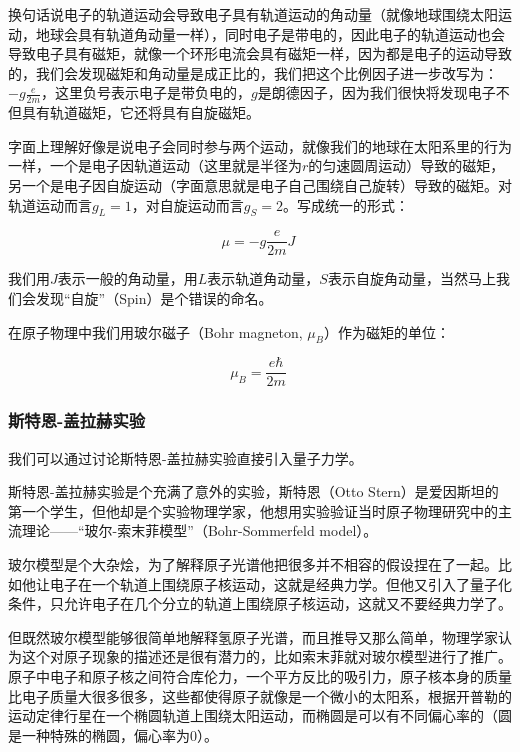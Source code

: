 换句话说电子的轨道运动会导致电子具有轨道运动的角动量（就像地球围绕太阳运动，地球会具有轨道角动量一样），同时电子是带电的，因此电子的轨道运动也会导致电子具有磁矩，就像一个环形电流会具有磁矩一样，因为都是电子的运动导致的，我们会发现磁矩和角动量是成正比的，我们把这个比例因子进一步改写为：$- g \frac{e}{2m}$，这里负号表示电子是带负电的，$g$是朗德因子，因为我们很快将发现电子不但具有轨道磁矩，它还将具有自旋磁矩。

字面上理解好像是说电子会同时参与两个运动，就像我们的地球在太阳系里的行为一样，一个是电子因轨道运动（这里就是半径为$r$的匀速圆周运动）导致的磁矩，另一个是电子因自旋运动（字面意思就是电子自己围绕自己旋转）导致的磁矩。对轨道运动而言$g_L = 1$，对自旋运动而言$g_S = 2$。写成统一的形式：

\begin{equation}
\mu = - g \frac{e}{2m} J~
\end{equation}

我们用$J$表示一般的角动量，用$L$表示轨道角动量，$S$表示自旋角动量，当然马上我们会发现“自旋”（Spin）是个错误的命名。

在原子物理中我们用玻尔磁子（Bohr magneton, $\mu_B$）作为磁矩的单位：

\begin{equation}
\mu_B = \frac{e \hbar }{ 2 m} ~
\end{equation}



\subsubsection{斯特恩-盖拉赫实验}

我们可以通过讨论斯特恩-盖拉赫实验直接引入量子力学。

斯特恩-盖拉赫实验是个充满了意外的实验，斯特恩（Otto Stern）是爱因斯坦的第一个学生，但他却是个实验物理学家，他想用实验验证当时原子物理研究中的主流理论——“玻尔-索末菲模型”（Bohr-Sommerfeld model）。

玻尔模型是个大杂烩，为了解释原子光谱他把很多并不相容的假设捏在了一起。比如他让电子在一个轨道上围绕原子核运动，这就是经典力学。但他又引入了量子化条件，只允许电子在几个分立的轨道上围绕原子核运动，这就又不要经典力学了。

但既然玻尔模型能够很简单地解释氢原子光谱，而且推导又那么简单，物理学家认为这个对原子现象的描述还是很有潜力的，比如索末菲就对玻尔模型进行了推广。原子中电子和原子核之间符合库伦力，一个平方反比的吸引力，原子核本身的质量比电子质量大很多很多，这些都使得原子就像是一个微小的太阳系，根据开普勒的运动定律行星在一个椭圆轨道上围绕太阳运动，而椭圆是可以有不同偏心率的（圆是一种特殊的椭圆，偏心率为0）。

